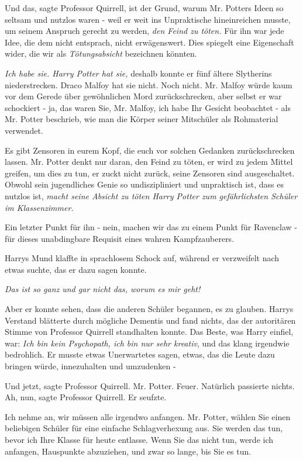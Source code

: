 \glqq Und das\grqq{}, sagte Professor Quirrell, \glqq ist der Grund, warum Mr.
Potters Ideen so seltsam und nutzlos waren - weil er weit ins Unpraktische
hineinreichen musste, um seinem Anspruch gerecht zu werden, \emph{den Feind zu
töten.} Für ihn war jede Idee, die dem nicht entsprach, nicht erwägenswert. Dies
spiegelt eine Eigenschaft wider, die wir als \emph{Tötungsabsicht} bezeichnen
könnten.

\emph{Ich habe sie. Harry Potter hat sie,} deshalb konnte er fünf ältere
Slytherins niederstrecken. Draco Malfoy hat sie nicht. Noch nicht. Mr. Malfoy
würde kaum vor dem Gerede über gewöhnlichen Mord zurückschrecken, aber selbst er
war schockiert - ja, das waren Sie, Mr. Malfoy, ich habe Ihr Gesicht beobachtet
- als Mr. Potter beschrieb, wie man die Körper seiner Mitschüler als Rohmaterial
verwendet.

Es gibt Zensoren in eurem Kopf, die euch vor solchen Gedanken zurückschrecken
lassen. Mr. Potter denkt nur daran, den Feind zu töten, er wird zu jedem Mittel
greifen, um dies zu tun, er zuckt nicht zurück, seine Zensoren sind
ausgeschaltet. Obwohl sein jugendliches Genie so undiszipliniert und unpraktisch
ist, dass es nutzlos ist, \emph{macht seine Absicht zu töten Harry Potter zum
gefährlichsten Schüler im Klassenzimmer.}

Ein letzter Punkt für ihn - nein, machen wir das zu einem Punkt für Ravenclaw -
für dieses unabdingbare Requisit eines wahren Kampfzauberers.\grqq{}

Harrys Mund klaffte in sprachlosem Schock auf, während er verzweifelt nach etwas
suchte, das er dazu sagen konnte.

\emph{Das ist so ganz und gar nicht das, worum es mir geht!}

Aber er konnte sehen, dass die anderen Schüler begannen, es zu glauben. Harrys
Verstand blätterte durch mögliche Dementis und fand nichts, das der autoritären
Stimme von Professor Quirrell standhalten konnte. Das Beste, was Harry einfiel,
war: \emph{\glqq Ich bin kein Psychopath, ich bin nur sehr kreativ\grqq{}}, und
das klang irgendwie bedrohlich. Er musste etwas Unerwartetes sagen, etwas, das
die Leute dazu bringen würde, innezuhalten und umzudenken -

\glqq Und jetzt\grqq{}, sagte Professor Quirrell. \glqq Mr. Potter.
Feuer.\grqq{} Natürlich passierte nichts. \glqq Ah, nun\grqq{}, sagte Professor
Quirrell. Er seufzte.

\glqq Ich nehme an, wir müssen alle irgendwo anfangen. Mr. Potter, wählen Sie
einen beliebigen Schüler für eine einfache Schlagverhexung aus. Sie werden das
tun, bevor ich Ihre Klasse für heute entlasse. Wenn Sie das nicht tun, werde ich
anfangen, Hauspunkte abzuziehen, und zwar so lange, bis Sie es tun.\grqq{}

